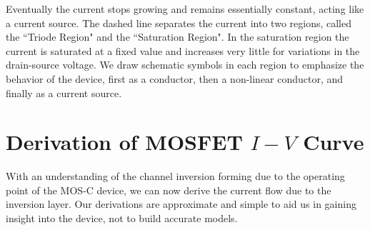 Eventually the current stops growing and remains essentially constant, acting like a current source.  The dashed line separates the current into two regions, called the ``Triode Region" and the ``Saturation Region".  In the saturation region the current is saturated at a fixed value and increases very little for variations in the drain-source voltage.  We draw schematic symbols in each region to emphasize the behavior of the device, first as a conductor, then a non-linear conductor, and finally as a current source.
\section{Derivation of MOSFET \texorpdfstring{$I-V$}{I-V} Curve}
With an understanding of the channel inversion forming due to the operating point of the MOS-C device, we can now derive the current flow due to the inversion layer.  Our derivations are approximate and simple to aid us in gaining insight into the device, not to build accurate models.
